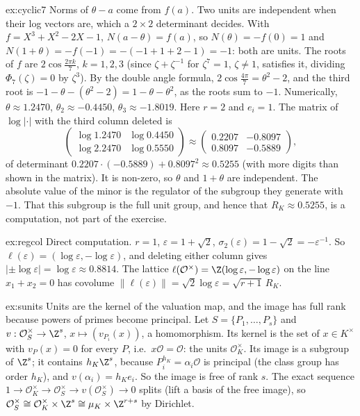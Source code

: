 \begin{solution}{ex:cyclic7}
\idea Norms of $\theta-a$ come from $f(a)$. Two units are independent when their log vectors are, which a $2\times2$ determinant
decides.
\writeup With $f=X^3+X^2-2X-1$, $N(a-\theta)=f(a)$, so $N(\theta)=-f(0)=1$ and $N(1+\theta)=-f(-1)=-(-1+1+2-1)=-1$: both are
units. The roots of $f$ are $2\cos\frac{2\pi k}7$, $k=1,2,3$ (since $\zeta+\zeta^{-1}$ for $\zeta^7=1$, $\zeta\ne1$, satisfies it,
dividing $\Phi_7(\zeta)=0$ by $\zeta^3$). By the double angle formula, $2\cos\frac{4\pi}7=\theta^2-2$, and the third root is
$-1-\theta-(\theta^2-2)=1-\theta-\theta^2$, as the roots sum to $-1$. Numerically, $\theta\approx1.2470$, $\theta_2\approx
-0.4450$, $\theta_3\approx-1.8019$. Here $r=2$ and $e_i=1$. The matrix of $\log|\cdot|$ with the third column deleted is
\[
\begin{pmatrix}\log1.2470&\log0.4450\\\log2.2470&\log0.5550\end{pmatrix}\approx\begin{pmatrix}0.2207&-0.8097\\0.8097&-0.5889
\end{pmatrix},
\]
of determinant $0.2207\cdot(-0.5889)+0.8097^2\approx0.5255$ (with more digits than shown in the matrix). It is non-zero, so $\theta$ and $1+\theta$ are
independent. The absolute value of the minor is the regulator of the subgroup they generate with $-1$. That this subgroup is the full unit group, and hence that $R_K\approx0.5255$, is a computation, not part of the exercise.
\end{solution}

\begin{solution}{ex:regcol}
\idea Direct computation.
\writeup $r=1$, $\varepsilon=1+\sqrt2$, $\sigma_2(\varepsilon)=1-\sqrt2=-\varepsilon^{-1}$. So $\ell(\varepsilon)=(\log\varepsilon,
-\log\varepsilon)$, and deleting either column gives $|\pm\log\varepsilon|=\log\varepsilon\approx0.8814$. The lattice
$\ell(\mathcal O^\times)=\Z(\log\varepsilon,-\log\varepsilon)$ on the line $x_1+x_2=0$ has covolume $\|\ell(\varepsilon)\|=
\sqrt2\log\varepsilon=\sqrt{r+1}\,R_K$.
\end{solution}

\begin{solution}{ex:sunits}
\idea Units are the kernel of the valuation map, and the image has full rank because powers of primes become principal.
\writeup Let $S=\{P_1,\dots,P_s\}$ and $v:\mathcal O_S^\times\to\Z^s$, $x\mapsto(v_{P_i}(x))$, a homomorphism. Its kernel is the set
of $x\in K^\times$ with $v_P(x)=0$ for every $P$, i.e.\ $x\mathcal O=\mathcal O$: the units $\mathcal O_K^\times$. Its image is a
subgroup of $\Z^s$; it contains $h_K\Z^s$, because $P_i^{h_K}=\alpha_i\mathcal O$ is principal (the class group has order $h_K$),
and $v(\alpha_i)=h_Ke_i$. So the image is free of rank $s$. The exact sequence $1\to\mathcal O_K^\times\to\mathcal O_S^\times
\to v(\mathcal O_S^\times)\to0$ splits (lift a basis of the free image), so $\mathcal O_S^\times\cong\mathcal O_K^\times\times
\Z^s\cong\mu_K\times\Z^{r+s}$ by Dirichlet.
\end{solution}

